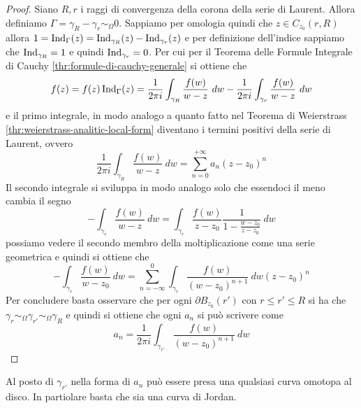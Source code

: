 \begin{proof}
  Siano $R,r$ i raggi di convergenza della corona della serie di Laurent. Allora
  definiamo $\Gamma = \gamma_R - \gamma_r \sim_\Omega 0$. Sappiamo per omologia
  quindi che $z \in C_{z_0}(r,R)$ allora $1 = \operatorname{Ind}_{\Gamma}(z) = 
  \operatorname{Ind}_{\gamma_R}(z) - \operatorname{Ind}_{\gamma_r}(z)$ e per definizione dell'indice 
  sappiamo che $\operatorname{Ind}_{\gamma_R} = 1$ e quindi $\operatorname{Ind}_{\gamma_r} = 0$. 
  Per cui per il Teorema delle Formule Integrale di Cauchy
  \ref{thr:formule-di-cauchy-generale} si ottiene che 
  \begin{equation*}
    f(z) = f(z)\operatorname{Ind}_{\Gamma}(z) = \frac{1}{2\pi i} \int_{\gamma_R}
    \frac{f(w)}{w-z}\ dw - \frac{1}{2\pi i}\int_{\gamma_r} \frac{f(w)}{w-z}\ dw
  \end{equation*}
  e il primo integrale, in modo analogo a quanto fatto nel Teorema di
  Weierstrass \ref{thr:weierstrass-analitic-local-form} diventano i termini positivi 
  della serie di Laurent, ovvero
  \begin{equation*}
    \frac{1}{2\pi i }\int_{\gamma_R} \frac{f(w)}{w-z}\ dw
    = \sum_{n=0}^{+\infty} a_n (z-z_0)^{n}
  \end{equation*}
  Il secondo integrale si sviluppa in modo analogo solo che essendoci il meno
  cambia il segno
  \begin{equation*}
    - \int_{\gamma_r} \frac{f(w)}{w-z}\ dw = \int_{\gamma_r}
    \frac{f(w)}{z-z_0} \frac{1}{1- \frac{w-z_0}{z -z_0}}\ dw
  \end{equation*}
  possiamo vedere il secondo membro della moltiplicazione come una serie
  geometrica e quindi si ottiene che 
  \begin{equation*}
    -\int_{\gamma_r} \frac{f(w)}{w-z_0}\ dw = \sum_{n=-\infty}^{0}
    \int_{\gamma_r} \frac{f(w)}{(w-z_0)^{n+1}}\ dw (z-z_0)^n
  \end{equation*}
  Per concludere basta osservare che per ogni $\partial B_{z_0}(r')$ con $r \le
  r' \le R$ si ha che $\gamma_r \sim_{\Omega} \gamma_{r'} \sim_{\Omega}
  \gamma_R$ e quindi si ottiene che ogni $a_n$ si può scrivere come 
  \begin{equation*}
    a_n = \frac{1}{2\pi i} \int_{\gamma_{r'}} \frac{f(w)}{(w-z_0)^{n+1}}\ dw
  \end{equation*}
\end{proof}

\begin{remark}
  Al posto di $\gamma_{r'}$ nella forma di $a_n$ può essere presa una qualsiasi
  curva omotopa al disco. In partiolare basta che sia una curva di Jordan.
  \label{rmk:cambiamento_bordo_di_integrazione}
\end{remark}


